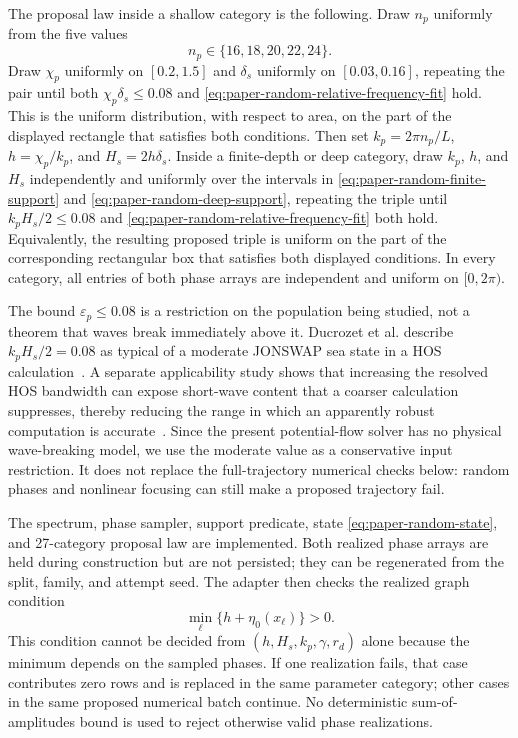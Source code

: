 The proposal law inside a shallow category is the following.  Draw
$n_p$ uniformly from the five values
\[
  n_p\in\{16,18,20,22,24\}.
\]
Draw $\chi_p$ uniformly on
$[0.2,1.5]$ and $\delta_s$ uniformly on $[0.03,0.16]$, repeating the pair
until both $\chi_p\delta_s\leq0.08$ and
\cref{eq:paper-random-relative-frequency-fit} hold.  This is the uniform
distribution, with respect to area, on the part of the displayed rectangle
that satisfies both conditions.  Then set $k_p=2\pi n_p/L$,
$h=\chi_p/k_p$, and $H_s=2h\delta_s$.  Inside a
finite-depth or deep category, draw $k_p$, $h$, and $H_s$ independently and
uniformly over the intervals in
\cref{eq:paper-random-finite-support} and
\cref{eq:paper-random-deep-support}, repeating the triple until
$k_pH_s/2\leq0.08$ and
\cref{eq:paper-random-relative-frequency-fit} both hold.  Equivalently, the
resulting proposed triple is uniform on the part of the corresponding
rectangular box that satisfies both displayed conditions.  In every
category, all entries of both phase arrays are independent and uniform on
$[0,2\pi)$.

The bound $\varepsilon_p\leq0.08$ is a restriction on the population being
studied, not a theorem that waves break immediately above it.  Ducrozet et
al. describe $k_pH_s/2=0.08$ as typical of a moderate JONSWAP sea state in a
HOS calculation~\cite{ducrozet2021rogue}.  A separate applicability study
shows that increasing the resolved HOS bandwidth can expose short-wave
content that a coarser calculation suppresses, thereby reducing the range in
which an apparently robust computation is accurate~\cite{ducrozet2017applicability}.
Since the present potential-flow solver has no physical wave-breaking model,
we use the moderate value as a conservative input restriction.  It does not
replace the full-trajectory numerical checks below: random phases and
nonlinear focusing can still make a proposed trajectory fail.

The spectrum, phase sampler, support predicate, state
\cref{eq:paper-random-state}, and 27-category proposal law are implemented.
Both realized phase arrays are held during construction but are not persisted;
they can be regenerated from the split, family, and attempt seed.  The adapter
then checks the
realized graph condition
\begin{equation}
  \min_\ell\{h+\eta_0(x_\ell)\}>0.
  \label{eq:paper-random-initial-graph-condition}
\end{equation}
This condition cannot be decided from $(h,H_s,k_p,\gamma,r_d)$ alone because
the minimum depends on the sampled phases.  If one realization fails, that
case contributes zero rows and is replaced in the same parameter category;
other cases in the same proposed numerical batch continue.  No deterministic
sum-of-amplitudes bound is used to reject otherwise valid phase realizations.

